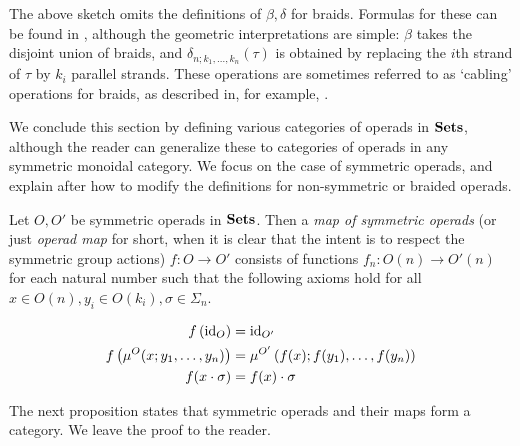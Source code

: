 \begin{rem}\label{rem:br-op-needed}
The above sketch omits the definitions of $\beta, \delta$ for braids. 
Formulas for these can be found in \cite[Examples~5.1.11,~5.1.13]{yau_infinity_2021}, although the geometric interpretations are simple: $\beta$ takes the disjoint union of braids, and $\delta_{n; k_1, \ldots, k_n}(\tau)$ is obtained by replacing the $i$th strand of $\tau$ by $k_i$ parallel strands.
These operations are sometimes referred to as `cabling' operations for braids, as described in, for example, \cite{doucot_local_2025}.
\end{rem}

\begin{example}\label{ex:braided-op}
\end{example}


We conclude this section by defining various categories of operads in $\mathbf{Sets}$, although the reader can generalize these to categories of operads in any symmetric monoidal category. We focus on the case of symmetric operads, and explain after how to modify the definitions for non-symmetric or braided operads.

\begin{Defi}\label{Defi:sym_op_map}
Let $O, O'$ be symmetric operads in $\mathbf{Sets}$. Then a \textit{map of symmetric operads} (or just \emph{operad map} for short, when it is clear that the intent is to respect the symmetric group actions) $f \colon O \rightarrow O'$ consists of functions $f_{n} \colon O(n) \rightarrow O'(n)$ for each natural number such that the following axioms hold for all $x \in O(n), y_i \in O(k_i), \sigma \in \Sigma_n$.

  \begin{align*}
    f\left(\textrm{id}_O\right) &= \textrm{id}_{O'}\\
    f\left(\mu^{O}(x;y_1,\ldots,y_n)\right) &= \mu^{O'}\left(f(x);f(y_1),\ldots,f(y_n)\right)\\
    f(x \cdot \sigma) & = f(x) \cdot \sigma
  \end{align*}
\end{Defi}

The next proposition states that symmetric operads and their maps form a category. We leave the proof to the reader.

